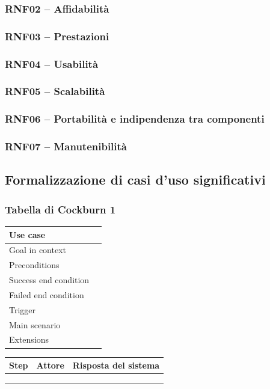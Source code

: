 \documentclass[italian,11pt,a4paper]{article}
\begin{document}
\subsubsection{RNF02 -- Affidabilità}

\subsubsection{RNF03 -- Prestazioni}

\subsubsection{RNF04 -- Usabilità}

\subsubsection{RNF05 -- Scalabilità}

\subsubsection{RNF06 -- Portabilità e indipendenza tra componenti}

\subsubsection{RNF07 -- Manutenibilità}

\newpage
\subsection{Formalizzazione di casi d'uso significativi}
\subsubsection{Tabella di Cockburn 1}
\begin{table}[H]\centering
\begin{tabularx}{\textwidth}{|p{4cm}|X|}\hline
\textbf{Use case} & \\\hline
Goal in context & \\\hline
Preconditions & \\\hline
Success end condition & \\\hline
Failed end condition & \\\hline
Trigger & \\\hline
Main scenario & \\\hline
Extensions & \\\hline
\end{tabularx}
\end{table}
\begin{table}[H]\centering
\begin{tabularx}{\textwidth}{|p{1.5cm}|X|X|}\hline
\textbf{Step} & \textbf{Attore} & \textbf{Risposta del sistema}\\\hline
 & & \\\hline
 & & \\\hline
 & & \\\hline
\end{tabularx}
\end{table}
\end{document}
